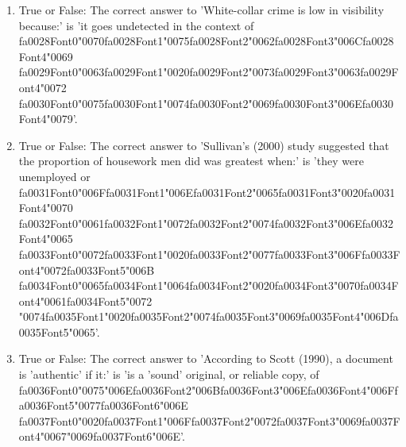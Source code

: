 \documentclass[12pt]{article}
\begin{document}
\begin{enumerate}[label=\arabic*.]
\item True or False: The correct answer to 'White-collar crime is low in visibility because:' is 'it goes undetected in the context of {\csname fa0028Font0\endcsname\char"0070}{\csname fa0028Font1\endcsname\char"0075}{\csname fa0028Font2\endcsname\char"0062}{\csname fa0028Font3\endcsname\char"006C}{\csname fa0028Font4\endcsname\char"0069} {\csname fa0029Font0\endcsname\char"0063}{\csname fa0029Font1\endcsname\char"0020}{\csname fa0029Font2\endcsname\char"0073}{\csname fa0029Font3\endcsname\char"0063}{\csname fa0029Font4\endcsname\char"0072} {\csname fa0030Font0\endcsname\char"0075}{\csname fa0030Font1\endcsname\char"0074}{\csname fa0030Font2\endcsname\char"0069}{\csname fa0030Font3\endcsname\char"006E}{\csname fa0030Font4\endcsname\char"0079}'.
\item True or False: The correct answer to 'Sullivan's (2000) study suggested that the proportion of housework men did was greatest when:' is 'they were unemployed or {\csname fa0031Font0\endcsname\char"006F}{\csname fa0031Font1\endcsname\char"006E}{\csname fa0031Font2\endcsname\char"0065}{\csname fa0031Font3\endcsname\char"0020}{\csname fa0031Font4\endcsname\char"0070} {\csname fa0032Font0\endcsname\char"0061}{\csname fa0032Font1\endcsname\char"0072}{\csname fa0032Font2\endcsname\char"0074}{\csname fa0032Font3\endcsname\char"006E}{\csname fa0032Font4\endcsname\char"0065} {\csname fa0033Font0\endcsname\char"0072}{\csname fa0033Font1\endcsname\char"0020}{\csname fa0033Font2\endcsname\char"0077}{\csname fa0033Font3\endcsname\char"006F}{\csname fa0033Font4\endcsname\char"0072}{\csname fa0033Font5\endcsname\char"006B} {\csname fa0034Font0\endcsname\char"0065}{\csname fa0034Font1\endcsname\char"0064}{\csname fa0034Font2\endcsname\char"0020}{\csname fa0034Font3\endcsname\char"0070}{\csname fa0034Font4\endcsname\char"0061}{\csname fa0034Font5\endcsname\char"0072} {\char"0074}{\csname fa0035Font1\endcsname\char"0020}{\csname fa0035Font2\endcsname\char"0074}{\csname fa0035Font3\endcsname\char"0069}{\csname fa0035Font4\endcsname\char"006D}{\csname fa0035Font5\endcsname\char"0065}'.
\item True or False: The correct answer to 'According to Scott (1990), a document is 'authentic' if it:' is 'is a 'sound' original, or reliable copy, of {\csname fa0036Font0\endcsname\char"0075}{\char"006E}{\csname fa0036Font2\endcsname\char"006B}{\csname fa0036Font3\endcsname\char"006E}{\csname fa0036Font4\endcsname\char"006F}{\csname fa0036Font5\endcsname\char"0077}{\csname fa0036Font6\endcsname\char"006E} {\csname fa0037Font0\endcsname\char"0020}{\csname fa0037Font1\endcsname\char"006F}{\csname fa0037Font2\endcsname\char"0072}{\csname fa0037Font3\endcsname\char"0069}{\csname fa0037Font4\endcsname\char"0067}{\char"0069}{\csname fa0037Font6\endcsname\char"006E}'.

\end{enumerate}
\end{document}

